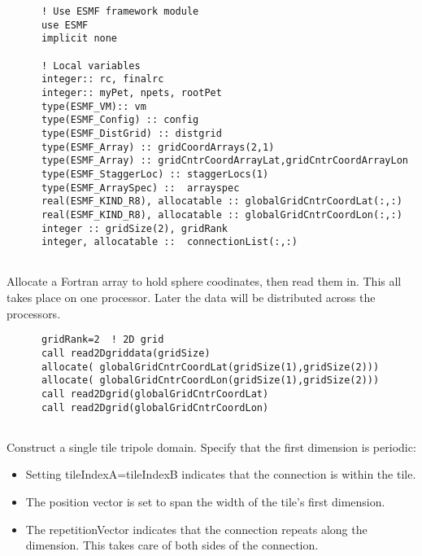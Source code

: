  \begin{verbatim}
      ! Use ESMF framework module
      use ESMF
      implicit none

      ! Local variables  
      integer:: rc, finalrc
      integer:: myPet, npets, rootPet
      type(ESMF_VM):: vm
      type(ESMF_Config) :: config
      type(ESMF_DistGrid) :: distgrid
      type(ESMF_Array) :: gridCoordArrays(2,1)
      type(ESMF_Array) :: gridCntrCoordArrayLat,gridCntrCoordArrayLon
      type(ESMF_StaggerLoc) :: staggerLocs(1)
      type(ESMF_ArraySpec) ::  arrayspec
      real(ESMF_KIND_R8), allocatable :: globalGridCntrCoordLat(:,:)
      real(ESMF_KIND_R8), allocatable :: globalGridCntrCoordLon(:,:)
      integer :: gridSize(2), gridRank
      integer, allocatable ::  connectionList(:,:)
 
\end{verbatim}
 

   Allocate a Fortran array to hold sphere coodinates, then read them in. This
   all takes place on one processor. Later the data will be distributed across the processors.  

 \begin{verbatim}
      gridRank=2  ! 2D grid
      call read2Dgriddata(gridSize)
      allocate( globalGridCntrCoordLat(gridSize(1),gridSize(2)))
      allocate( globalGridCntrCoordLon(gridSize(1),gridSize(2)))
      call read2Dgrid(globalGridCntrCoordLat)
      call read2Dgrid(globalGridCntrCoordLon)
 
\end{verbatim}
 

   Construct a single tile tripole domain. 
   Specify that the first dimension is periodic: \\
  
   \begin{itemize}
   \item Setting tileIndexA=tileIndexB indicates that the connection 
        is within the tile.
   \item The position vector is set to span the width of the tile's 
        first dimension.
   \item The repetitionVector indicates that the connection repeats along
             the dimension. This takes care of both sides of the connection.
   \end{itemize} 

